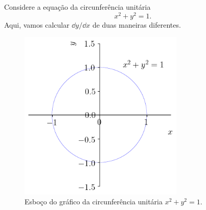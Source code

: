 \begin{ex}\label{ex:derivimp_cric}
  Considere a equação da circunferência unitária
  \begin{equation}\label{eq:deriv_circ}
    x^2 + y^2 = 1.
  \end{equation}
  Aqui, vamos calcular $\dd y/\dd x$ de duas maneiras diferentes.

  \begin{figure}[H]
    \centering
    \includegraphics[width=0.7\textwidth]{./cap_deriv/dados/fig_circ/fig}
    \caption{Esboço do gráfico da circunferência unitária $x^2 + y^2 = 1$.}
    \label{fig:circ}
  \end{figure}


\end{ex}
